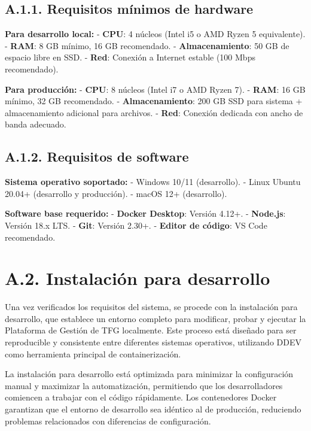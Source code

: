 \documentclass[12pt,a4paper,oneside]{report}
\begin{document}
\subsection{A.1.1. Requisitos mínimos de
hardware}\label{a.1.1.-requisitos-muxednimos-de-hardware}

\textbf{Para desarrollo local:} - \textbf{CPU}: 4 núcleos (Intel i5 o
AMD Ryzen 5 equivalente). - \textbf{RAM}: 8 GB mínimo, 16 GB
recomendado. - \textbf{Almacenamiento}: 50 GB de espacio libre en SSD. -
\textbf{Red}: Conexión a Internet estable (100 Mbps recomendado).

\textbf{Para producción:} - \textbf{CPU}: 8 núcleos (Intel i7 o AMD
Ryzen 7). - \textbf{RAM}: 16 GB mínimo, 32 GB recomendado. -
\textbf{Almacenamiento}: 200 GB SSD para sistema + almacenamiento
adicional para archivos. - \textbf{Red}: Conexión dedicada con ancho de
banda adecuado.

\subsection{A.1.2. Requisitos de
software}\label{a.1.2.-requisitos-de-software}

\textbf{Sistema operativo soportado:} - Windows 10/11 (desarrollo). -
Linux Ubuntu 20.04+ (desarrollo y producción). - macOS 12+ (desarrollo).

\textbf{Software base requerido:} - \textbf{Docker Desktop}: Versión
4.12+. - \textbf{Node.js}: Versión 18.x LTS. - \textbf{Git}: Versión
2.30+. - \textbf{Editor de código}: VS Code recomendado.

\section{A.2. Instalación para
desarrollo}\label{a.2.-instalaciuxf3n-para-desarrollo}

Una vez verificados los requisitos del sistema, se procede con la instalación para desarrollo, que establece un entorno completo para modificar, probar y ejecutar la Plataforma de Gestión de TFG localmente. Este proceso está diseñado para ser reproducible y consistente entre diferentes sistemas operativos, utilizando DDEV como herramienta principal de containerización.

La instalación para desarrollo está optimizada para minimizar la configuración manual y maximizar la automatización, permitiendo que los desarrolladores comiencen a trabajar con el código rápidamente. Los contenedores Docker garantizan que el entorno de desarrollo sea idéntico al de producción, reduciendo problemas relacionados con diferencias de configuración.
\end{document}
